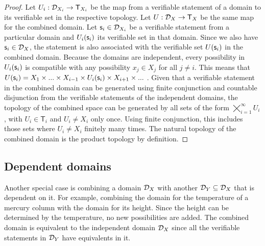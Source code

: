 \documentclass[11pt,letterpaper,fleqn]{memoir} %
\begin{document}
\begin{mathSection}
\begin{prop}
	\end{prop}
	\begin{proof}
		Let $U_i : \mathcal{D}_{X_i} \to \mathsf{T}_{X_i}$ be the map from a verifiable statement of a domain to its verifiable set in the respective topology. Let $U : \mathcal{D}_{X} \to \mathsf{T}_X$ be the same map for the combined domain. Let $\mathsf{s}_i \in \mathcal{D}_{X_i}$ be a verifiable statement from a particular domain and $U_i(\mathsf{s}_i)$ its verifiable set in that domain. Since we also have $\mathsf{s}_i \in \mathcal{D}_{X}$, the statement is also associated with the verifiable set $U(\mathsf{s}_i)$ in the combined domain. Because the domains are independent, every possibility in $U_i(\mathsf{s}_i)$ is compatible with any possibility $x_j \in X_j$ for all $j \neq i$. This means that $U(\mathsf{s}_i)=X_1\times ... \times X_{i-1} \times U_i(\mathsf{s}_i) \times X_{i+1} \times ...$ . Given that a verifiable statement in the combined domain can be generated using finite conjunction and countable disjunction from the verifiable statements of the independent domains, the topology of the combined space can be generated by all sets of the form $\bigtimes\limits_{i=1}^{\infty} U_{i}$, with $U_i \in \mathsf{T}_i$ and $U_i \neq X_i$ only once. Using finite conjunction, this includes those sets where $U_i \neq X_i$ finitely many times. The natural topology of the combined domain is the product topology by definition.
	\end{proof}
\end{mathSection}

\subsection{Dependent domains}

Another special case is combining a domain $\mathcal{D}_X$ with another $\mathcal{D}_Y \subseteq \mathcal{D}_X$ that is dependent on it. For example, combining the domain for the temperature of a mercury column with the domain for its height. Since the height can be determined by the temperature, no new possibilities are added. The combined domain is equivalent to the independent domain $\mathcal{D}_X$ since all the verifiable statements in $\mathcal{D}_Y$ have equivalents in it.
\end{document}
